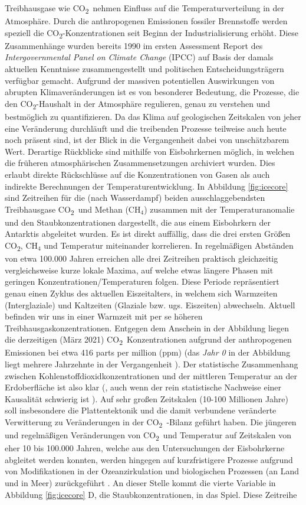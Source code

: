 \documentclass[12pt,a4paper,onecolumn,headheight=30pt]{scrartcl}
\newcommand{\cotwo}{CO\textsubscript{2}}
\begin{document}
Treibhausgase wie \cotwo \ nehmen Einfluss auf die Temperaturverteilung in der Atmosphäre. Durch die anthropogenen Emissionen fossiler Brennstoffe werden speziell die \cotwo -Konzentrationen seit Beginn der Industrialisierung erhöht. Diese Zusammenhänge wurden bereits 1990 im ersten Assessment Report des \textit{Intergovernmental Panel on Climate Change} (IPCC) auf Basis der damals aktuellen Kenntnisse zusammengestellt und politischen Entscheidungsträgern verfügbar gemacht. Aufgrund der massiven potentiellen Auswirkungen von abrupten Klimaveränderungen \citep{IPCCpol.2018} ist es von besonderer Bedeutung, die Prozesse, die den \cotwo -Haushalt in der Atmosphäre regulieren, genau zu verstehen und bestmöglich zu quantifizieren. Da das Klima auf geologischen Zeitskalen von jeher eine Veränderung durchläuft und die treibenden Prozesse teilweise auch heute noch präsent sind, ist der Blick in die Vergangenheit dabei von unschätzbarem Wert. Derartige Rückblicke sind mithilfe von Eisbohrkernen möglich, in welchen die früheren atmosphärischen Zusammensetzungen archiviert wurden. Dies erlaubt direkte Rückschlüsse auf die Konzentrationen von Gasen als auch indirekte Berechnungen der Temperaturentwicklung. In Abbildung \ref{fig:icecore} sind  Zeitreihen für die (nach Wasserdampf) beiden ausschlaggebendsten Treibhausgase \cotwo \ und Methan (CH$_4$) zusammen mit der Temperaturanomalie und den Staubkonzentrationen dargestellt, die aus einem Eisbohrkern der Antarktis abgeleitet wurden. Es ist direkt auffällig, dass die drei ersten Größen \cotwo , CH$_4$ und Temperatur miteinander korrelieren. In regelmäßigen Abständen von etwa 100.000 Jahren erreichen alle drei Zeitreihen praktisch gleichzeitig vergleichsweise kurze lokale Maxima, auf welche etwas längere Phasen mit geringen Konzentrationen/Temperaturen folgen. Diese Periode repräsentiert genau einen Zyklus des aktuellen Eiszeitalters, in welchem sich Warmzeiten (Interglaziale) und Kaltzeiten (Glaziale bzw. ugs. Eiszeiten) abwechseln. Aktuell befinden wir uns in einer Warmzeit mit per se höheren Treibhausgaskonzentrationen. Entgegen dem Anschein in der Abbildung liegen die derzeitigen (März 2021) \cotwo \ Konzentrationen aufgrund der anthropogenen Emissionen bei etwa 416 parts per million (ppm) \citep{NASA.06.05.2021} (das \textit{Jahr 0} in der Abbildung liegt mehrere Jahrzehnte in der Vergangenheit \citep{Luthi.2008}). Der statistische Zusammenhang zwischen Kohlenstoffdioxidkonzentrationen und der mittleren Temperatur an der Erdoberfläche ist also klar (, auch wenn der rein statistische Nachweise einer Kausalität schwierig ist \citep{Stips.2016}). Auf sehr großen Zeitskalen (10-100 Millionen Jahre) soll insbesondere die Plattentektonik und die damit verbundene veränderte Verwitterung zu Veränderungen in der \cotwo \ -Bilanz geführt haben. Die jüngeren und regelmäßigen Veränderungen von \cotwo \ und Temperatur auf Zeitskalen von eher 10 bis 100.000 Jahren, welche aus den Untersuchungen der Eisbohrkerne abgleitet werden konnten, werden hingegen auf kurzfristigere Prozesse aufgrund von Modifikationen in der Ozeanzirkulation und biologischen Prozessen (an Land und in Meer) zurückgeführt \citep{Emerson.2009}. An dieser Stelle kommt die vierte Variable in Abbildung \ref{fig:icecore} D, die Staubkonzentrationen, in das Spiel. Diese Zeitreihe 
\end{document}
